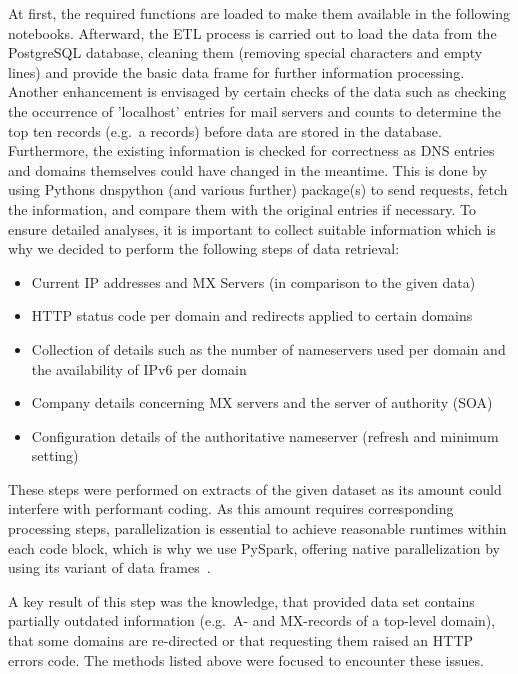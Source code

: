 At first, the required functions are loaded to make them available in the following notebooks.
Afterward, the ETL process is carried out to load the data from the PostgreSQL database, cleaning them (removing special characters and empty lines) and provide the basic data frame for further information processing.
Another enhancement is envisaged by certain checks of the data such as checking the occurrence of 'localhost' entries for mail servers and counts to determine the top ten records (e.g.\ a records) before data are stored in the database.
Furthermore, the existing information is checked for correctness as DNS entries and domains themselves could have changed in the meantime.
This is done by using Pythons dnspython (and various further) package(s) to send requests, fetch the information, and compare them with the original entries if necessary.
To ensure detailed analyses, it is important to collect suitable information which is why we decided to perform the following steps of data retrieval:
\begin{itemize}
    \item Current IP addresses and MX Servers (in comparison to the given data)
    \item HTTP status code per domain and redirects applied to certain domains
    \item Collection of details such as the number of nameservers used per domain and the availability of IPv6 per domain
    \item Company details concerning MX servers and the server of authority (SOA)
    \item Configuration details of the authoritative nameserver (refresh and minimum setting)
\end{itemize}
These steps were performed on extracts of the given dataset as its amount could interfere with performant coding.
As this amount requires corresponding processing steps, parallelization is essential to achieve reasonable runtimes within each code block, which is why we use PySpark, offering native parallelization by using its variant of data frames~\autocite[cf.][]{Weber.2019}.

A key result of this step was the knowledge, that provided data set contains partially outdated information (e.g.\ A- and MX-records of a top-level domain), that some domains are re-directed or that requesting them raised an HTTP errors code.
The methods listed above were focused to encounter these issues.

